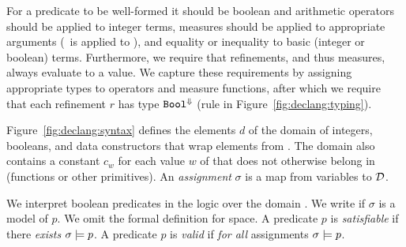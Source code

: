 
For a predicate to be well-formed it should be boolean and
arithmetic operators 
should be applied to integer terms, measures should be applied 
to appropriate arguments 
(\ie \eisNull\ is applied to \tintlist),
and equality or inequality to basic 
(integer or boolean) terms.
%
Furthermore, we require that refinements, and thus measures,
always evaluate to a value.
%
We capture these requirements by assigning appropriate types 
to operators and measure functions, after which we require that
each refinement $r$ has type ${\mathtt{Bool}}^{\Downarrow}$ (rule \rwbased in
Figure~\ref{fig:declang:typing}).

Figure~\ref{fig:declang:syntax} defines the elements $d$
of the domain \dom 
of integers, booleans, and data constructors that wrap
elements from \dom.
%
The domain \dom also contains a constant $c_w$
for each value $w$ of \undeclang that does 
not otherwise belong in \dom (\eg functions or other primitives).
%
An \emph{assignment} $\sigma$ is a map from variables 
to $\mathcal{D}$.

We interpret boolean predicates in the logic over the domain 
\dom.
%
We write  %
if $\sigma$ is a model of $p$.
%
We omit the formal definition for space.
%
A predicate $p$ is \emph{satisfiable}  %
if there \emph{exists} $\sigma \models p$. %
%
A predicate $p$ is \emph{valid} %
if \emph{for all} assignments $\sigma \models p$. %
%


